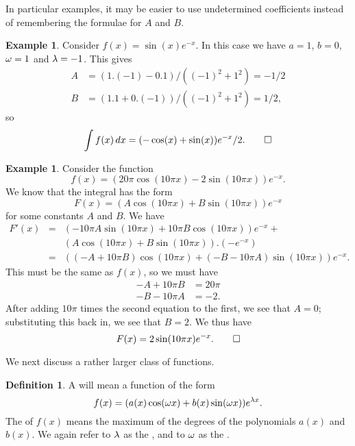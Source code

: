 \documentclass[a4paper]{book}
\theoremstyle{definition}
\newtheorem{definition}[theorem]{Definition}
\newtheorem{example}[theorem]{Example}
\begin{document}
In particular examples, it may be easier to use undetermined
coefficients instead of remembering the formulae for $A$ and $B$.
\begin{example}
 Consider $f(x)=\sin(x)e^{-x}$.  In this case we have $a=1$, $b=0$,
 $\omega=1$ and $\lambda=-1$.  This gives 
 \begin{align*}
  A &= (1.(-1)-0.1)/((-1)^2+1^2) = -1/2 \\
  B &= (1.1+0.(-1))/((-1)^2+1^2) = 1/2,
 \end{align*}
 so
 \[ \int f(x)\, dx = (-\cos(x)+\sin(x)) e^{-x}/2. \qed \]
\end{example}
\begin{example}
 Consider the function 
 \[ f(x) = (20\pi \cos(10\pi x) - 2 \sin(10\pi x)) e^{-x}. \]
 We know that the integral has the form
 \[ F(x) = (A\cos(10\pi x) + B\sin(10\pi x)) e^{-x} \]
 for some constants $A$ and $B$.  We have 
 \begin{eqnarray*}
  F'(x)
   &=& (-10\pi A\sin(10\pi x) + 10\pi B\cos(10\pi x)) e^{-x} + \\
   &&  (A\cos(10\pi x) + B\sin(10\pi x)). (-e^{-x}) \\
   &=& ((-A+10\pi B)\cos(10\pi x) + (-B-10\pi A)\sin(10\pi x))e^{-x}. 
 \end{eqnarray*}
 This must be the same as $f(x)$, so we must have
 \begin{align*}
  -A+10\pi B &= 20\pi \\
  -B-10\pi A &= -2.
 \end{align*}
 After adding $10\pi$ times the second equation to the first, we see
 that $A=0$; substituting this back in, we see that $B=2$.  We thus
 have 
 \[ F(x) = 2\sin(10\pi x)e^{-x}. \qed \]
\end{example}

We next discuss a rather larger class of functions.  
\begin{definition}
 A  will mean a function of
 the form
 \[ f(x) = (a(x)\cos(\omega x) + b(x)\sin(\omega x)) e^{\lambda x}. \]
 The  of $f(x)$ means the maximum of the degrees of the
 polynomials $a(x)$ and $b(x)$.  We again refer to $\lambda$ as the
 , and to $\omega$ as the .
\end{definition}
\end{document}
